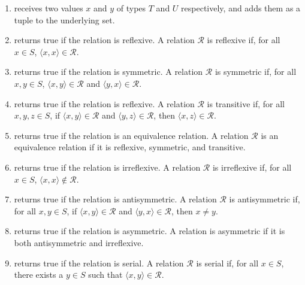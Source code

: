 \begin{enumerate}[label=(\alph*)]
    \item {} receives two values $x$ and $y$ of types $T$ and $U$ respectively, and adds them as a tuple to the underlying set.
    
    \item {} returns true if the relation is reflexive. A relation $\mathcal{R}$ is reflexive if, for all $x \in S$, $\langle{x, x}\rangle \in \mathcal{R}$.
    
    \item {} returns true if the relation is symmetric. A relation $\mathcal{R}$ is symmetric if, for all $x, y \in S$, $\langle{x, y}\rangle \in \mathcal{R}$ and $\langle{y, x}\rangle \in \mathcal{R}$.
    
    \item {} returns true if the relation is reflexive. A relation $\mathcal{R}$ is transitive if, for all $x, y, z \in S$, if $\langle{x, y}\rangle \in \mathcal{R}$ and $\langle{y, z}\rangle \in \mathcal{R}$, then $\langle{x, z}\rangle \in \mathcal{R}$.
    
    \item {} returns true if the relation is an equivalence relation. A relation $\mathcal{R}$ is an equivalence relation if it is reflexive, symmetric, and transitive.

    \item {} returns true if the relation is irreflexive. A relation $\mathcal{R}$ is irreflexive if, for all $x \in S$, $\langle{x, x}\rangle \not\in \mathcal{R}$.
    
    \item {} returns true if the relation is antisymmetric. A relation $\mathcal{R}$ is antisymmetric if, for all $x, y \in S$, if $\langle{x, y}\rangle \in \mathcal{R}$ and $\langle{y, x}\rangle \in \mathcal{R}$, then $x \neq y$.
    
    \item {} returns true if the relation is asymmetric. A relation is asymmetric if it is both antisymmetric and irreflexive.

    \item {} returns true if the relation is serial. A relation $\mathcal{R}$ is serial if, for all $x \in S$, there exists a $y \in S$ such that $\langle{x, y}\rangle \in \mathcal{R}$.


\end{enumerate}
